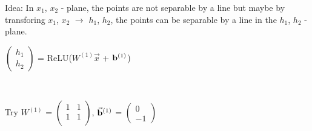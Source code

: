 \begin{example}
    Idea: In $x_1$, $x_2$ - plane, the points are not separable by a line but maybe by transforing $x_1$, $x_2$ $\to$ $h_1$, $h_2$, the points can be separable by a line in the $h_1$, $h_2$ - plane.\\
    \centerline{
        $ \begin{pmatrix}
            h_{1}\\
            h_{2}
        \end{pmatrix} $ = ReLU($W^{(1)}\Vec{x}$ + $\vb^{(1)}$)
        }\\
    \centerline{
        Try $W^{(1)}$ = $ \begin{pmatrix}
            1 & 1\\
            1 & 1\\
        \end{pmatrix} $,
        $\Vec{\vb}^{(1)}$ = $ \begin{pmatrix}
            0\\
            -1
        \end{pmatrix} $
    }\\
    

\end{example}

